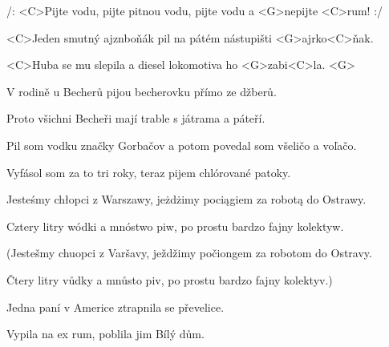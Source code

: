 
\zr
/: <C>Pijte vodu, pijte pitnou vodu, pijte vodu a <G>nepijte <C>rum! :/
\kr

\zs
<C>Jeden smutný ajznboňák pil na pátém nástupišti 
<G>ajrko<C>ňak.

<C>Huba se mu slepila a diesel lokomotiva ho <G>zabi<C>la. <G>
\ks

\zr \kr

\zs
V rodině u Becherů pijou becherovku přímo ze džberů.

Proto všichni Becheři mají trable s játrama a páteří.
\ks

\zr \kr

\zs
Pil som vodku značky Gorbačov a potom povedal som všeličo a voľačo.

Vyfásol som za to tri roky, teraz pijem chlórované patoky.
\ks

\zr \kr

\zs
Jesteśmy chłopci z Warszawy, jeżdżimy pociągiem za robotą do Ostrawy.

Cztery litry wódki a mnóstwo piw, po prostu bardzo fajny kolektyw.

(Jestešmy chuopci z Varšavy, ježdžimy počiongem za robotom do Ostravy.

Čtery litry vůdky a mnůsto piv, po prostu bardzo fajny kolektyv.)

\ks

\zr \kr

\zs
Jedna paní v Americe ztrapnila se převelice.

Vypila na ex rum, poblila jim Bílý dům.
\ks

\zr \kr

\kp
